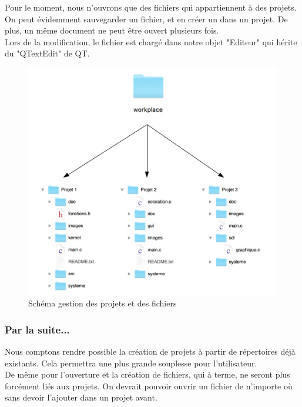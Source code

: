 \documentclass[a4paper,12pt]{article}
\begin{document}
		Pour le moment, nous n'ouvrons que des fichiers qui appartiennent à des projets. On peut évidemment sauvegarder un fichier, et en créer un dans un projet. De plus, un même document ne peut être ouvert plusieurs fois.\\
		Lors de la modification, le fichier est chargé dans notre objet "Editeur" qui hérite du "QTextEdit" de QT.
		
		\begin{figure}[h!]
			\begin{center}
				\includegraphics[scale=0.5]{images/nav_fic}
				\caption{Schéma gestion des projets et des fichiers}
			\end{center}
		\end{figure}
		
		\newpage
			
		\subsubsection*{Par la suite...}
		
				Nous comptons rendre possible la création de projets à partir de répertoires déjà existants. Cela permettra une plus grande souplesse pour l'utilisateur.\\
				De même pour l'ouverture et la création de fichiers, qui à terme, ne seront plus forcément liés aux projets. On devrait pouvoir ouvrir un fichier de n'importe où sans devoir l'ajouter dans un projet avant.\\
				
\end{document}
